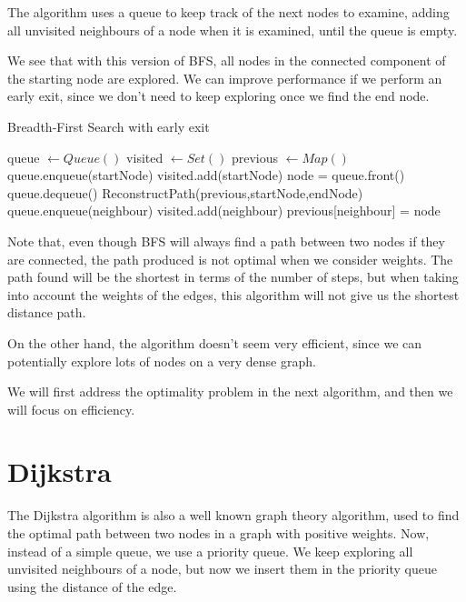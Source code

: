 \documentclass[12pt]{report}
\begin{document}
The algorithm uses a queue to keep track of the next nodes to examine, adding all unvisited neighbours of a node when it is examined, until the queue is empty.

We see that with this version of BFS, all nodes in the connected component of the starting node are explored. We can improve performance if we perform an early exit, since we don't need to keep exploring once we find the end node.


\begin{algorithm}
\caption{Breadth-First Search with early exit}
\begin{algorithmic}[1]
\State queue $\gets Queue()$
\State visited $\gets Set()$
\State previous $\gets Map()$
\State queue.enqueue(startNode)
\State visited.add(startNode)
	\State node = queue.front()
	\State queue.dequeue()
			 
				\State \Return ReconstructPath(previous,startNode,endNode)
			\EndIf
			\State queue.enqueue(neighbour)
			\State visited.add(neighbour)
			\State previous[neighbour] = node
		\EndIf
	\EndFor
\EndWhile
\EndProcedure
\end{algorithmic}
\end{algorithm}

Note that, even though BFS will always find a path between two nodes if they are connected, the path produced is not optimal when we consider weights. The path found will be the shortest in terms of the number of steps, but when taking into account the weights of the edges, this algorithm will not give us the shortest distance path.


On  the other hand, the algorithm doesn't seem very efficient, since we can potentially explore lots of nodes on a very dense graph.

We will first address the optimality problem in the next algorithm, and then we will focus on efficiency.

\section{Dijkstra}
The Dijkstra algorithm is also a well known graph theory algorithm, used to find the optimal path between two nodes in a graph with positive weights. Now, instead of a simple queue, we use a priority queue. We keep exploring all unvisited neighbours of a node, but now we insert them in the priority queue using the distance of the edge.
\end{document}
